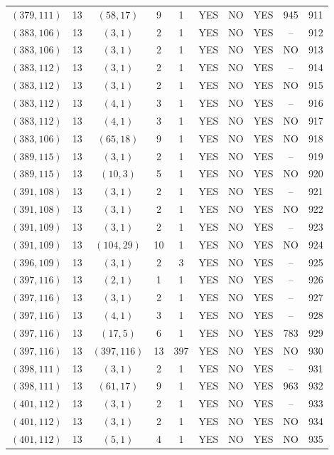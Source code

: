 \begin{longtable}{|c|c|c|c|c|c|c|c|c|c|}
$(379, 111)$ & 13 & $(58, 17)$ & 9 & 1 & YES & NO & YES & 945 & 911\\
$(383, 106)$ & 13 & $(3, 1)$ & 2 & 1 & YES & NO & YES & -- & 912\\
$(383, 106)$ & 13 & $(3, 1)$ & 2 & 1 & YES & NO & YES & NO & 913\\
$(383, 112)$ & 13 & $(3, 1)$ & 2 & 1 & YES & NO & YES & -- & 914\\
$(383, 112)$ & 13 & $(3, 1)$ & 2 & 1 & YES & NO & YES & NO & 915\\
$(383, 112)$ & 13 & $(4, 1)$ & 3 & 1 & YES & NO & YES & -- & 916\\
$(383, 112)$ & 13 & $(4, 1)$ & 3 & 1 & YES & NO & YES & NO & 917\\
$(383, 106)$ & 13 & $(65, 18)$ & 9 & 1 & YES & NO & YES & NO & 918\\
$(389, 115)$ & 13 & $(3, 1)$ & 2 & 1 & YES & NO & YES & -- & 919\\
$(389, 115)$ & 13 & $(10, 3)$ & 5 & 1 & YES & NO & YES & NO & 920\\
$(391, 108)$ & 13 & $(3, 1)$ & 2 & 1 & YES & NO & YES & -- & 921\\
$(391, 108)$ & 13 & $(3, 1)$ & 2 & 1 & YES & NO & YES & NO & 922\\
$(391, 109)$ & 13 & $(3, 1)$ & 2 & 1 & YES & NO & YES & -- & 923\\
$(391, 109)$ & 13 & $(104, 29)$ & 10 & 1 & YES & NO & YES & NO & 924\\
$(396, 109)$ & 13 & $(3, 1)$ & 2 & 3 & YES & NO & YES & -- & 925\\
$(397, 116)$ & 13 & $(2, 1)$ & 1 & 1 & YES & NO & YES & -- & 926\\
$(397, 116)$ & 13 & $(3, 1)$ & 2 & 1 & YES & NO & YES & -- & 927\\
$(397, 116)$ & 13 & $(4, 1)$ & 3 & 1 & YES & NO & YES & -- & 928\\
$(397, 116)$ & 13 & $(17, 5)$ & 6 & 1 & YES & NO & YES & 783 & 929\\
$(397, 116)$ & 13 & $(397, 116)$ & 13 & 397 & YES & NO & YES & NO & 930\\
$(398, 111)$ & 13 & $(3, 1)$ & 2 & 1 & YES & NO & YES & -- & 931\\
$(398, 111)$ & 13 & $(61, 17)$ & 9 & 1 & YES & NO & YES & 963 & 932\\
$(401, 112)$ & 13 & $(3, 1)$ & 2 & 1 & YES & NO & YES & -- & 933\\
$(401, 112)$ & 13 & $(3, 1)$ & 2 & 1 & YES & NO & YES & NO & 934\\
$(401, 112)$ & 13 & $(5, 1)$ & 4 & 1 & YES & NO & YES & NO & 935\\

\end{longtable}
